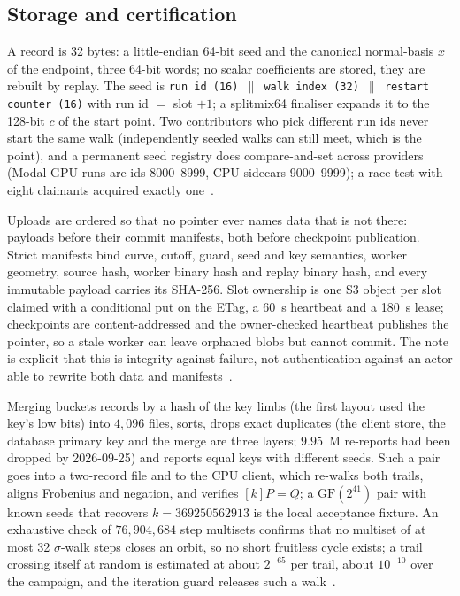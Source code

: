 \subsection{Storage and certification}
\label{sec:campaign-storage}

A record is 32 bytes: a little-endian 64-bit seed and the canonical
normal-basis $x$ of the endpoint, three 64-bit words; no scalar
coefficients are stored, they are rebuilt by replay. The seed is \texttt{run id (16) $\|$ walk index (32) $\|$ restart
counter (16)} with run id $=$ slot $+1$; a splitmix64 finaliser
expands it to the 128-bit $c$ of the start point. Two contributors who
pick different run ids never start the same walk (independently
seeded walks can still meet, which is the point), and a permanent seed
registry does compare-and-set across providers (Modal GPU runs are ids
8000--8999, CPU sidecars 9000--9999); a race test with eight claimants
acquired exactly one~.

Uploads are ordered so that no pointer ever names data that is not
there: payloads before their commit manifests, both before checkpoint
publication. Strict manifests bind curve, cutoff, guard, seed and key
semantics, worker geometry, source hash, worker binary hash and
replay binary hash, and every immutable payload carries its SHA-256.
Slot ownership is one S3 object per slot claimed with a conditional
put on the ETag, a 60~s heartbeat and a 180~s lease; checkpoints are
content-addressed and the owner-checked heartbeat publishes the
pointer, so a stale worker can leave orphaned blobs but cannot commit.
The note is explicit that this is integrity against failure, not
authentication against an actor able to rewrite both data and
manifests~.

Merging buckets records by a hash of the key limbs (the first layout
used the key's low bits) into $4{,}096$ files, sorts, drops exact duplicates (the client store, the database primary
key and the merge are three layers; $9.95$~M re-reports had been
dropped by 2026-09-25) and reports equal keys with different seeds.
Such a pair goes into a two-record file and to the CPU client, which
re-walks both trails, aligns Frobenius and negation, and verifies
$[k]P=Q$; a $\mathrm{GF}(2^{41})$ pair with known seeds that recovers
$k=369250562913$ is the local acceptance fixture. An exhaustive check of $76{,}904{,}684$ step multisets confirms that
no multiset of at most 32 $\sigma$-walk steps closes an orbit, so no
short fruitless cycle exists; a trail crossing itself at random is
estimated at about $2^{-65}$ per trail, about $10^{-10}$ over the
campaign, and the iteration guard releases such a
walk~.

